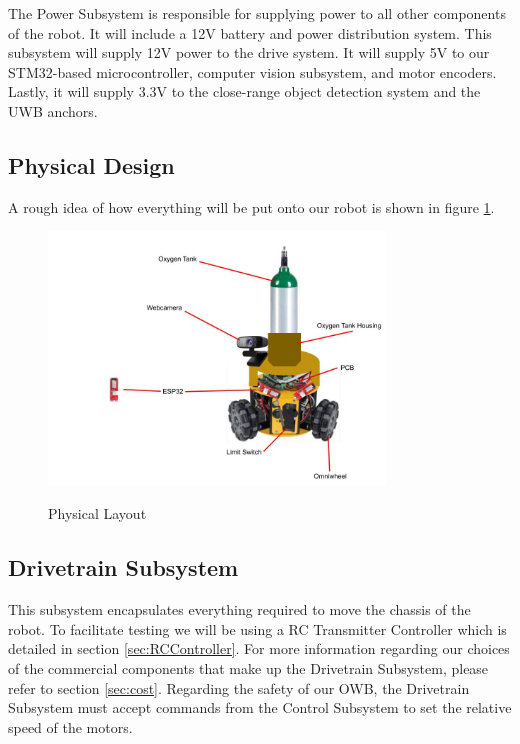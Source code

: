 \documentclass[journal,onecolumn, draftclsnofoot, 12pt]{IEEEtran}
\begin{document}
\begin{itemize}
    The Power Subsystem is responsible for supplying power to all other components of the robot. It will include a 12V battery and power distribution system. This subsystem will supply 12V power to the drive system. It will supply 5V to our STM32-based microcontroller, computer vision subsystem, and motor encoders. Lastly, it will supply 3.3V to the close-range object detection system and the UWB anchors.
\end{itemize}

\newpage

\subsection{Physical Design}
A rough idea of how everything will be put onto our robot is shown in figure \ref{fig:PhysicalDesign}.

\begin{figure}[H]
\begin{center}
    \includegraphics[width=0.8\textwidth]{PhysicalDesign.png}\\
    \caption{ Physical Layout  } 
    \label{fig:PhysicalDesign}
\end{center}
\end{figure}

\subsection{Drivetrain Subsystem}
This subsystem encapsulates everything required to move the chassis of the robot. To facilitate testing we will be using a RC Transmitter Controller which is detailed in section \ref{sec:RCController}. For more information regarding our choices of the commercial components that make up the Drivetrain Subsystem, please refer to section \ref{sec:cost}. Regarding the safety of our OWB, the Drivetrain Subsystem must accept commands from the Control Subsystem to set the relative speed of the motors.
\end{document}
